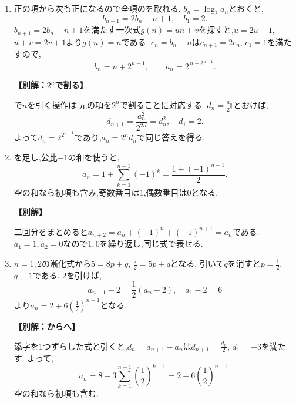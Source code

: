 \begin{enumerate}[label=\textbf{問\arabic*.},leftmargin=3.8em,format=\bookitemlink{practice-basic}{solution}{problem}]
  \item {}\BookMathLayout{}{\\}
    正の項から次も正になるので全項のを取れる.
    $b_n=\log_2a_n$とおくと,
    \[
      b_{n+1}=2b_n-n+1,\quad b_1=2.
    \]
    $b_{n+1}=2b_n-n+1$を満たす一次式$g(n)=un+v$を探すと,$u=2u-1$, $u+v=2v+1$より$g(n)=n$である.
    $c_n=b_n-n$は$c_{n+1}=2c_n$, $c_1=1$を満たすので,
    \[
      b_n=n+2^{n-1},\qquad a_n=2^{\,n+2^{n-1}}.
    \]
    \par\smallskip\noindent\textbf{【別解：$2^n$で割る】}\par
    で$n$を引く操作は,元の項を$2^n$で割ることに対応する.
    $d_n=\frac{a_n}{2^n}$とおけば,
    \[
      d_{n+1}=\frac{a_n^2}{2^{2n}}=d_n^2,\quad d_1=2.
    \]
    よって$d_n=2^{2^{n-1}}$であり,$a_n=2^nd_n$で同じ答えを得る.

  \item {}\BookMathLayout{}{\\}
    を足し,公比$-1$の和を使うと,
    \[
      a_n=1+\sum_{k=1}^{n-1}(-1)^k
      =\frac{1+(-1)^{n-1}}2.
    \]
    空の和なら初項も含み,奇数番目は$1$,偶数番目は$0$となる.
    \par\smallskip\noindent\textbf{【別解】}\par
    二回分をまとめると$a_{n+2}=a_n+(-1)^n+(-1)^{n+1}=a_n$である.
    $a_1=1,a_2=0$なので$1,0$を繰り返し,同じ式で表せる.

  \item {}\BookMathLayout{}{\\}
    $n=1,2$の漸化式から$5=8p+q$, $\frac{7}{2}=5p+q$となる.
    引いて$q$を消すと$p=\frac{1}{2}$, $q=1$である.
    $2$を引けば,
    \[
      a_{n+1}-2=\frac12(a_n-2),\quad a_1-2=6
    \]
    より$a_n=2+6\left(\frac{1}{2}\right)^{n-1}$となる.
    \par\smallskip\noindent\textbf{【別解：からへ】}\par
    添字を1つずらした式と引くと,$d_n=a_{n+1}-a_n$は$d_{n+1}=\frac{d_n}{2}$, $d_1=-3$を満たす.
    よって,
    \[
      a_n=8-3\sum_{k=1}^{n-1}\left(\frac12\right)^{k-1}
      =2+6\left(\frac12\right)^{n-1}.
    \]
    空の和なら初項も含む.


\end{enumerate}
